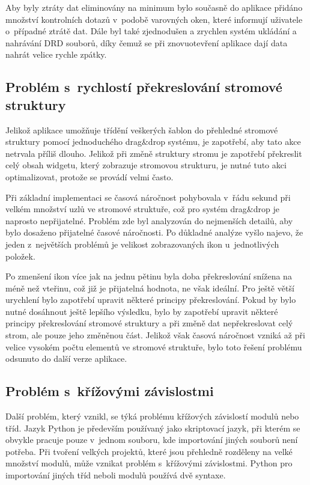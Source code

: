 \documentclass[thesis=B,czech]{resources/FITthesis}[2012/06/26]
\begin{document}
Aby byly ztráty dat eliminovány na minimum bylo současně do aplikace přidáno množství kontrolních dotazů v~podobě varovných oken, které informují uživatele o~případné ztrátě dat. Dále byl také zjednodušen a zrychlen systém ukládání a nahrávání DRD souborů, díky čemuž se při znovuotevření aplikace dají data nahrát velice rychle zpátky. 

	\subsection{Problém s~rychlostí překreslování stromové struktury}
Jelikož aplikace umožňuje třídění veškerých šablon do přehledné stromové struktury pomocí jednoduchého drag\&drop systému, je zapotřebí, aby tato akce netrvala příliš dlouho. Jelikož při změně struktury stromu je zapotřebí překreslit celý obsah widgetu, který zobrazuje stromovou strukturu, je nutné tuto akci optimalizovat, protože se provádí velmi často. \par

Při základní implementaci se časová náročnost pohybovala v~řádu sekund při velkém množství uzlů ve stromové struktuře, což pro systém drag\&drop je naprosto nepřijatelné. Problém zde byl analyzován do nejmenších detailů, aby bylo dosaženo přijatelné časové náročnosti. Po důkladné analýze vyšlo najevo, že jeden z~největších problémů je velikost zobrazovaných ikon u~jednotlivých položek. \par

Po zmenšení ikon více jak na jednu pětinu byla doba překreslování snížena na méně než vteřinu, což již je přijatelná hodnota, ne však ideální. Pro ještě větší urychlení bylo zapotřebí upravit některé principy překreslování. Pokud by bylo nutné dosáhnout ještě lepšího výsledku, bylo by zapotřebí upravit některé principy překreslování stromové struktury a při změně dat nepřekreslovat celý strom, ale pouze jeho změněnou část. Jelikož však časová náročnost vzniká až při velice vysokém počtu elementů ve stromové struktuře, bylo toto řešení problému odsunuto do další verze aplikace. 

	\subsection{Problém s~křížovými závislostmi}
Další problém, který vznikl, se týká problému křížových závislostí modulů nebo tříd. Jazyk Python je především používaný jako skriptovací jazyk, při kterém se obvykle pracuje pouze v~jednom souboru, kde importování jiných souborů není potřeba. Při tvoření velkých projektů, které jsou přehledně rozděleny na velké množství modulů, může vznikat problém s~křížovými závislostmi. Python pro importování jiných tříd neboli modulů používá dvě syntaxe.
\end{document}
